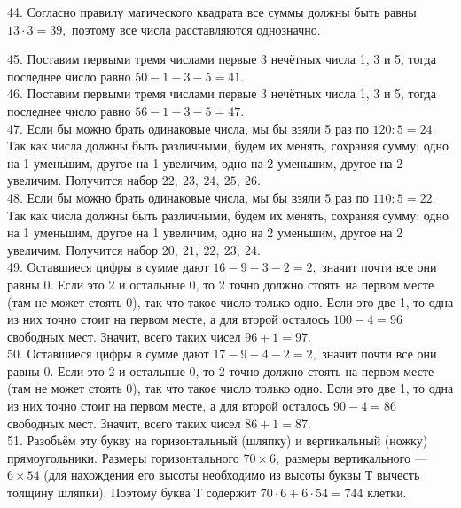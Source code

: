 \begin{center}
\begin{figure}[ht!]
\end{figure}
\end{center}
44. Согласно правилу магического квадрата все суммы должны быть равны $13\cdot3=39,$ поэтому все числа расставляются однозначно.
\begin{center}
\begin{figure}[ht!]
\end{figure}
\end{center}
45. Поставим первыми тремя числами первые 3 нечётных числа 1, 3 и 5, тогда последнее число равно $50-1-3-5=41.$\\
46. Поставим первыми тремя числами первые 3 нечётных числа 1, 3 и 5, тогда последнее число равно $56-1-3-5=47.$\\
47. Если бы можно брать одинаковые числа, мы бы взяли 5 раз по $120:5=24.$ Так как числа должны быть различными, будем их менять, сохраняя сумму: одно на 1 уменьшим, другое на 1 увеличим, одно на 2 уменьшим, другое на 2 увеличим. Получится набор $22,\ 23,\ 24,\ 25,\ 26.$\\
48. Если бы можно брать одинаковые числа, мы бы взяли 5 раз по $110:5=22.$ Так как числа должны быть различными, будем их менять, сохраняя сумму: одно на 1 уменьшим, другое на 1 увеличим, одно на 2 уменьшим, другое на 2 увеличим. Получится набор $20,\ 21,\ 22,\ 23,\ 24.$\\
49. Оставшиеся цифры в сумме дают $16-9-3-2=2,$ значит почти все они равны 0. Если это 2 и остальные 0, то 2 точно должно стоять на первом месте (там не может стоять 0), так что такое число только одно. Если это две 1, то одна из них точно стоит на первом месте, а для второй осталось $100-4=96$ свободных мест. Значит, всего таких чисел $96+1=97.$\\
50. Оставшиеся цифры в сумме дают $17-9-4-2=2,$ значит почти все они равны 0. Если это 2 и остальные 0, то 2 точно должно стоять на первом месте (там не может стоять 0), так что такое число только одно. Если это две 1, то одна из них точно стоит на первом месте, а для второй осталось $90-4=86$ свободных мест. Значит, всего таких чисел $86+1=87.$\\
51. Разобьём эту букву на горизонтальный (шляпку) и вертикальный (ножку) прямоугольники. Размеры горизонтального $70\times6,$ размеры вертикального --- $6\times54$ (для нахождения его высоты необходимо из высоты буквы Т вычесть толщину шляпки). Поэтому буква Т содержит $70\cdot6+6\cdot54=744$ клетки.\\
